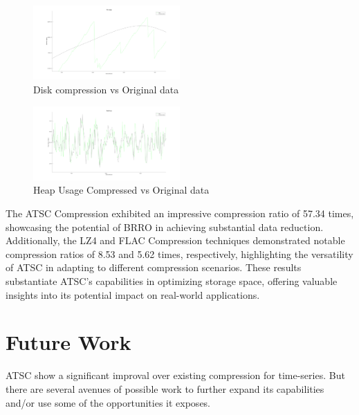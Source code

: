 \documentclass[conference]{IEEEtran}
\begin{document}
\begin{figure}[h]
    \centering
    \includegraphics[width=0.5\textwidth]{disk-usage-validation.png}
    \caption{Disk compression vs Original data}
    \label{Disk}
  \end{figure}

  \begin{figure}[h]
    \centering
    \includegraphics[width=0.5\textwidth]{heap-usage-validation.png}
    \caption{Heap Usage Compressed vs Original data}
    \label{heap}
  \end{figure}
\vspace{10pt}
The ATSC Compression exhibited an impressive compression ratio of 57.34 times, showcasing the potential of BRRO in achieving substantial data reduction. Additionally, the LZ4 and FLAC Compression techniques demonstrated notable compression ratios of 8.53 and 5.62 times, respectively, highlighting the versatility of ATSC in adapting to different compression scenarios. 
These results substantiate ATSC's capabilities in optimizing storage space, offering valuable insights into its potential impact on real-world applications. 

\section{Future Work}

ATSC show a significant improval over existing compression for time-series. But there are several avenues of possible work to further expand its capabilities and/or use some of the opportunities it exposes.

\end{document}
